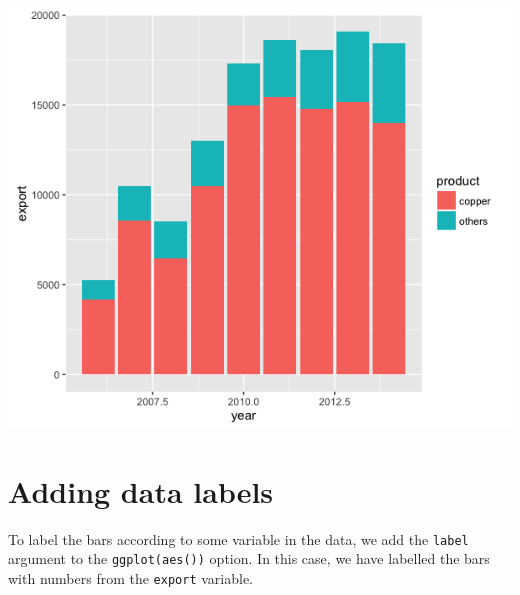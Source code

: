 \begin{Shaded}
\begin{Highlighting}[]
\StringTok{ }\NormalTok{() +}\StringTok{ }\NormalTok{(}\NormalTok{(}   
\StringTok{        } \NormalTok{)}
\end{Highlighting}
\end{Shaded}

\begin{center}\includegraphics[width=0.55\linewidth]{0_all_posts_pdf/bar_1-1} \end{center}

\section{Adding data labels}\label{adding-data-labels}

To label the bars according to some variable in the data, we add the
\texttt{label} argument to the \texttt{ggplot(aes())} option. In this
case, we have labelled the bars with numbers from the \texttt{export}
variable.

\begin{Shaded}
\begin{Highlighting}[]
\StringTok{ }\StringTok{ }\NormalTok{(}\NormalTok{(}  
\StringTok{        } \NormalTok{)}
\end{Highlighting}
\end{Shaded}

